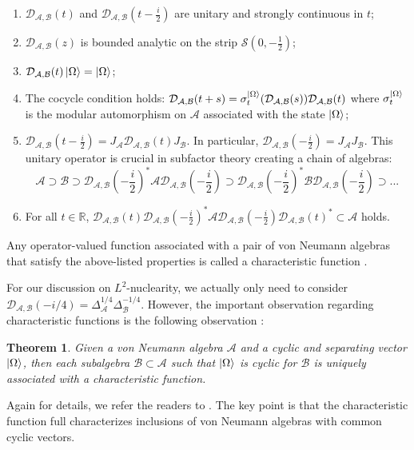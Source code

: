 \documentclass[a4paper,11pt]{article}
\newtheorem{theorem}{Theorem}
\theoremstyle{definition}
\begin{document}
\begin{enumerate}
    \item $\mathcal{D}_{\mathcal{A},\mathcal{B}}(t)$ and $\mathcal{D}_{\mathcal{A}, \mathcal{B}}(t - \frac{i}{2})$ are unitary and strongly continuous in $t$;
    \item $\mathcal{D}_{\mathcal{A},\mathcal{B}}(z)$ is bounded analytic on the strip $\mathcal{S}(0,-\frac{1}{2})$;
    \item $\mathcal{D}_{\mathcal{A},\mathcal{B}}(t)\ket{\Omega} = \ket{\Omega}$;
    \item The cocycle condition holds: $\mathcal{D}_{\mathcal{A},\mathcal{B}}(t+s) = \sigma_t^{\ket{\Omega}}(\mathcal{D}_{\mathcal{A},\mathcal{B}}(s))\mathcal{D}_{\mathcal{A},\mathcal{B}}(t)$ where $\sigma_t^{\ket{\Omega}}$ is the modular automorphism on $\mathcal{A}$ associated with the state $\ket{\Omega}$;
    \item $\mathcal{D}_{\mathcal{A},\mathcal{B}}(t - \frac{i}{2}) = J_\mathcal{A}\mathcal{D}_{\mathcal{A},\mathcal{B}}(t)J_\mathcal{B}$. In particular, $\mathcal{D}_{\mathcal{A},\mathcal{B}}(-\frac{i}{2}) = J_\mathcal{A}J_\mathcal{B}$. This unitary operator is crucial in subfactor theory creating a chain of algebras:
    \begin{equation}
        \mathcal{A}\supset\mathcal{B}\supset\mathcal{D}_{\mathcal{A},\mathcal{B}}(-\frac{i}{2})^*\mathcal{A}\mathcal{D}_{\mathcal{A},\mathcal{B}}(-\frac{i}{2})\supset\mathcal{D}_{\mathcal{A},\mathcal{B}}(-\frac{i}{2})^*\mathcal{B}\mathcal{D}_{\mathcal{A},\mathcal{B}}(-\frac{i}{2})\supset...
    \end{equation}
    \item For all $t\in\mathbb{R}$, $\mathcal{D}_{\mathcal{A},\mathcal{B}}(t)\mathcal{D}_{\mathcal{A},\mathcal{B}}(-\frac{i}{2})^*\mathcal{A}\mathcal{D}_{\mathcal{A},\mathcal{B}}(-\frac{i}{2})\mathcal{D}_{\mathcal{A},\mathcal{B}}(t)^*\subset\mathcal{A}$ holds.
\end{enumerate}
Any operator-valued function associated with a pair of von Neumann algebras that satisfy the above-listed properties is called a characteristic function \cite{revolutionizing}.

For our discussion on $L^2$-nuclearity, we actually only need to consider $\mathcal{D}_{\mathcal{A},\mathcal{B}}(-i/4) = \Delta_\mathcal{A}^{1/4}\Delta_\mathcal{B}^{-1/4}$. However, the important observation regarding characteristic functions is the following observation \cite{revolutionizing}:
\begin{theorem}
    Given a von Neumann algebra $\mathcal{A}$ and a cyclic and separating vector $\ket{\Omega}$, then each subalgebra $\mathcal{B}\subset\mathcal{A}$ such that $\ket{\Omega}$ is cyclic for $\mathcal{B}$ is uniquely associated with a characteristic function.
\end{theorem}
Again for details, we refer the readers to \cite{revolutionizing}. The key point is that the characteristic function full characterizes inclusions of von Neumann algebras with common cyclic vectors. 
\end{document}
